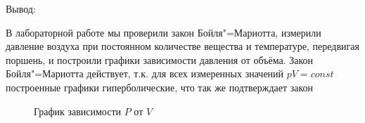 Вывод:

В лабораторной работе мы проверили закон Бойля"=Мариотта, измерили давление воздуха при постоянном количестве вещества и температуре, передвигая поршень, и построили графики зависимости давления от объёма. Закон Бойля"=Мариотта действует, т.к. для всех измеренных значений $p V = const$ построенные графики гиперболические, что так же подтверждает закон

\begin{figure}[!h]
\begin{center}
  \end{center}
\caption{График зависимости $P$ от $V$}
\label{graph:main_graph}
\end{figure}
